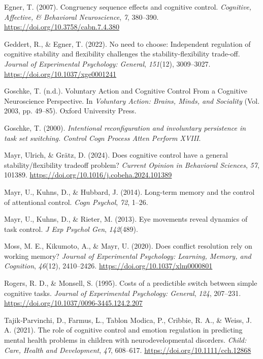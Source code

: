 \documentclass[
  english,
  man,floatsintext]{apa6}
\newlength{\cslhangindent}
\newenvironment{CSLReferences}[2] %
 {\begin{list}{}{%
  \setlength{\itemindent}{0pt}
  \setlength{\leftmargin}{0pt}
  \setlength{\parsep}{0pt}
  \ifodd #1
   \setlength{\leftmargin}{\cslhangindent}
   \setlength{\itemindent}{-1\cslhangindent}
  \fi
  \setlength{\itemsep}{#2\baselineskip}}}
 {\end{list}}
\begin{document}
\begin{CSLReferences}{1}{0}
Egner, T. (2007). Congruency sequence effects and cognitive control. \emph{Cognitive, Affective, \& Behavioral Neuroscience}, \emph{7}, 380--390. \url{https://doi.org/10.3758/cabn.7.4.380}

Geddert, R., \& Egner, T. (2022). No need to choose: {Independent} regulation of cognitive stability and flexibility challenges the stability-flexibility trade-off. \emph{Journal of Experimental Psychology: General}, \emph{151}(12), 3009--3027. \url{https://doi.org/10.1037/xge0001241}

Goschke, T. (n.d.). Voluntary {Action} and {Cognitive} {Control} {From} a {Cognitive} {Neuroscience} {Perspective}. In \emph{Voluntary {Action}: {Brains}, {Minds}, and {Sociality}} (Vol. 2003, pp. 49--85). Oxford University Press.

Goschke, T. (2000). \emph{Intentional reconfiguration and involuntary persistence in task set switching. {Control} {Cogn} {Process} {Atten} {Perform} {XVIII}}.

Mayr, Ulrich, \& Grätz, D. (2024). Does cognitive control have a general stability/flexibility tradeoff problem? \emph{Current Opinion in Behavioral Sciences}, \emph{57}, 101389. \url{https://doi.org/10.1016/j.cobeha.2024.101389}

Mayr, U., Kuhns, D., \& Hubbard, J. (2014). Long-term memory and the control of attentional control. \emph{Cogn Psychol}, \emph{72}, 1--26.

Mayr, U., Kuhns, D., \& Rieter, M. (2013). Eye movements reveal dynamics of task control. \emph{J Exp Psychol Gen}, \emph{142}(489).

Moss, M. E., Kikumoto, A., \& Mayr, U. (2020). Does conflict resolution rely on working memory? \emph{Journal of Experimental Psychology: Learning, Memory, and Cognition}, \emph{46}(12), 2410--2426. \url{https://doi.org/10.1037/xlm0000801}

Rogers, R. D., \& Monsell, S. (1995). Costs of a predictible switch between simple cognitive tasks. \emph{Journal of Experimental Psychology: General}, \emph{124}, 207--231. \url{https://doi.org/10.1037/0096-3445.124.2.207}

Tajik‐Parvinchi, D., Farmus, L., Tablon Modica, P., Cribbie, R. A., \& Weiss, J. A. (2021). The role of cognitive control and emotion regulation in predicting mental health problems in children with neurodevelopmental disorders. \emph{Child: Care, Health and Development}, \emph{47}, 608--617. \url{https://doi.org/10.1111/cch.12868}

\end{CSLReferences}
\end{document}
